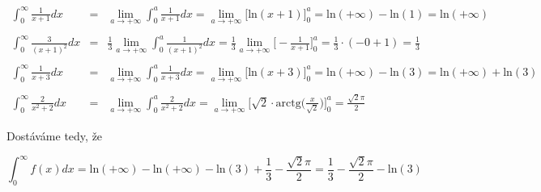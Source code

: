 \begin{eqnarray}
\int_{0}^{\infty} \frac{1}{x+1} dx \quad & = & \lim_{a \rightarrow +\infty}\int_{0}^{a} \frac{1}{x+1} dx =  \lim_{a \rightarrow +\infty}\big[\mbox{ln}(x + 1)\big]_0^a = \mbox{ln}(+\infty) - \mbox{ln}(1) = \mbox{ln}(+\infty)\nonumber \\ \quad \nonumber\\
\int_{0}^{\infty} \frac{3}{(x+1)^2} dx & =  &\frac{1}{3} \lim_{a \rightarrow +\infty}\int_{0}^{a} \frac{1}{(x + 1)^2} dx = \frac{1}{3} \lim_{a \rightarrow +\infty} \Big[ -\frac{1}{x+1}\Big]^a_0 = \frac{1}{3}\cdot(-0 + 1) = \frac{1}{3} \nonumber \\ \quad \nonumber\\
\int_{0}^{\infty} \frac{1}{x+3} dx \quad \, &  = &  \lim_{a \rightarrow +\infty}\int_{0}^{a} \frac{1}{x+3}dx = \lim_{a \rightarrow +\infty}\big[\mbox{ln}(x + 3)\big]_0^a = \mbox{ln}(+\infty) - \mbox{ln}(3) = \mbox{ln}(+\infty) + \mbox{ln}(3)\nonumber \\ \quad \nonumber\\
\int_{0}^{\infty} \frac{2}{x^2+2} dx \quad & =  &\lim_{a \rightarrow +\infty}\int_{0}^{a} \frac{2}{x^2+2} dx =  \lim_{a \rightarrow +\infty} \Big[ \sqrt{2}\cdot\mbox{arctg}\Big(\frac{x}{\sqrt{2}}\Big)\Big]^a_0 = \frac{\sqrt{2}\pi}{2}\nonumber \quad \nonumber

\end{eqnarray}

\noindent Dostáváme tedy, že

\begin{displaymath}
\int_{0}^{\infty} f(x)dx = \mbox{ln}(+\infty) - \mbox{ln}(+\infty) - \mbox{ln}(3) + \frac{1}{3} - \frac{\sqrt{2}\pi}{2} = \frac{1}{3} - \frac{\sqrt{2}\pi}{2} - \mbox{ln}(3)
\end{displaymath}





